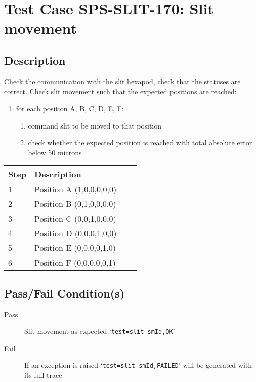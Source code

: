 \section{Test Case SPS-SLIT-170: Slit movement}

\subsection{Description}

Check the communication with the slit hexapod, check that the statuses are correct.
Check slit movement such that the expected positions are reached:

\begin{enumerate}
    \item for each position A, B, C, D, E, F:
    \begin{enumerate}
        \item command slit to be moved to that position
        \item check whether the expected position is reached with total absolute error below 50 microns
    \end{enumerate}
\end{enumerate}

\begin{table}[H]
    \begin{tabular}{|l| p{5cm} |l| p{5cm} |}
    \hline
    {\bf Step} & {\bf Description}  \\ \hline
    1 & Position A (1,0,0,0,0,0) \\ \hline
    2 & Position B (0,1,0,0,0,0) \\ \hline
    3 & Position C (0,0,1,0,0,0) \\ \hline
    4 & Position D (0,0,0,1,0,0) \\ \hline
    5 & Position E (0,0,0,0,1,0) \\ \hline
    6 & Position F (0,0,0,0,0,1) \\ \hline
    \end{tabular}
\end{table}

\subsection{Pass/Fail Condition(s)}

\begin{description}
\item [Pass] Slit movement as expected `\texttt{test=slit-smId,OK}'
\item [Fail] If an exception is raised `\texttt{test=slit-smId,FAILED}' will be generated with its full trace.
\end{description}

